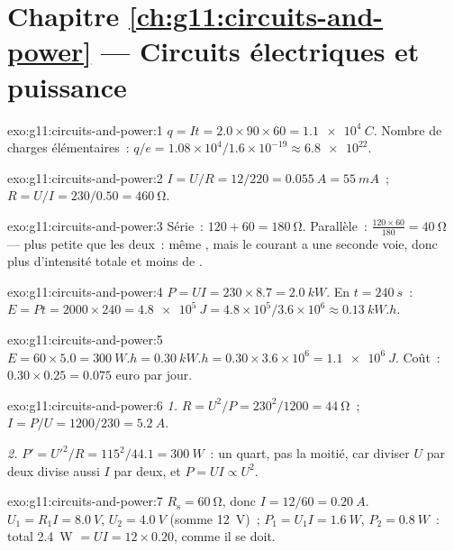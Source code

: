 \section*{Chapitre \ref{ch:g11:circuits-and-power} --- Circuits électriques et puissance}

\begin{solution}{exo:g11:circuits-and-power:1}
$q = It = 2.0 \times 90 \times 60 = \qty{1.1e4}{C}$. Nombre de charges
élémentaires~: $q/e = 1.08\times10^{4}/1.6\times10^{-19} \approx
\num{6.8e22}$.
\end{solution}

\begin{solution}{exo:g11:circuits-and-power:2}
$I = U/R = 12/220 = \qty{0.055}{A} = \qty{55}{mA}$~;
$R = U/I = 230/0.50 = \qty{460}{\ohm}$.
\end{solution}

\begin{solution}{exo:g11:circuits-and-power:3}
Série~: $120 + 60 = \qty{180}{\ohm}$. Parallèle~:
$\frac{120 \times 60}{180} = \qty{40}{\ohm}$ --- plus petite que les
deux~: même , mais le courant a une
seconde voie, donc plus d'intensité totale et moins de
.
\end{solution}

\begin{solution}{exo:g11:circuits-and-power:4}
$P = UI = 230 \times 8.7 = \qty{2.0}{kW}$. En $t = \qty{240}{s}$~:
$E = Pt = 2000 \times 240 = \qty{4.8e5}{J} = 4.8\times10^{5}/3.6
\times10^{6} \approx \qty{0.13}{kW.h}$.
\end{solution}

\begin{solution}{exo:g11:circuits-and-power:5}
$E = 60 \times 5.0 = \qty{300}{W.h} = \qty{0.30}{kW.h} = 0.30 \times
3.6\times10^{6} = \qty{1.1e6}{J}$. Coût~: $0.30 \times 0.25 = 0.075$
euro par jour.
\end{solution}

\begin{solution}{exo:g11:circuits-and-power:6}
\emph{1.} $R = U^2/P = 230^2/1200 = \qty{44}{\ohm}$~;
$I = P/U = 1200/230 = \qty{5.2}{A}$.

\emph{2.} $P' = U'^2/R = 115^2/44.1 = \qty{300}{W}$~: un quart, pas la
moitié, car diviser $U$ par deux divise aussi $I$ par deux, et
$P = UI \propto U^2$.
\end{solution}

\begin{solution}{exo:g11:circuits-and-power:7}
$R_{\text{s}} = \qty{60}{\ohm}$, donc $I = 12/60 = \qty{0.20}{A}$.
$U_1 = R_1 I = \qty{8.0}{V}$, $U_2 = \qty{4.0}{V}$ (somme \qty{12}{V})~;
$P_1 = U_1 I = \qty{1.6}{W}$, $P_2 = \qty{0.8}{W}$~: total \qty{2.4}{W}
$= UI = 12 \times 0.20$, comme il se doit.
\end{solution}

